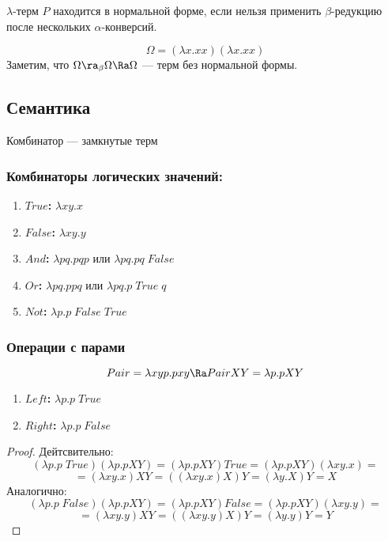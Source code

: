 \begin{definition}
    \(\lambda\)-терм \(P\) находится в нормальной форме, если нельзя применить \(\beta\)-редукцию после нескольких \(\alpha\)-конверсий.
\end{definition}

\begin{example}
    \[\Omega = (\lambda x.xx)(\lambda x.xx)\]
    Заметим, что \(\Omega \ra_\beta \Omega \Ra \Omega\) --- терм без нормальной формы.
\end{example}

\subsection{Семантика}
\begin{definition}
    Комбинатор --- замкнутые терм
\end{definition}

\subsubsection{Комбинаторы логических значений:}
\begin{enumerate}
    \item \textbf{\(True\):} \(\lambda xy.x\)
    \item \textbf{\(False\):} \(\lambda xy.y\)
    \item \textbf{\(And\):} \(\lambda pq.pqp\) или \(\lambda pq.pq\;False\)
    \item \textbf{\(Or\):} \(\lambda pq.ppq\) или \(\lambda pq.p\;True\;q\)
    \item \textbf{\(Not\):} \(\lambda p.p\;False\;True\)
\end{enumerate}

\subsubsection{Операции с парами}
\[Pair = \lambda xyp.pxy \Ra Pair XY = \lambda p.pXY\]
\begin{enumerate}
    \item \textbf{\(Left\):} \(\lambda p.p\;True\)
    \item \textbf{\(Right\):} \(\lambda p.p\;False\)
\end{enumerate}

\begin{proof}
    Дейтсвительно:
    \[(\lambda p.p\;True)(\lambda p.pXY) = (\lambda p.pXY)True = (\lambda p.pXY)(\lambda xy.x) = \]
    \[= (\lambda xy.x)XY = ((\lambda xy.x)X)Y = (\lambda y.X)Y = X\]
    Аналогично:
    \[(\lambda p.p\;False)(\lambda p.pXY) = (\lambda p.pXY)False = (\lambda p.pXY)(\lambda xy.y) = \]
    \[= (\lambda xy.y)XY = ((\lambda xy.y)X)Y = (\lambda y.y)Y = Y\]
\end{proof}

